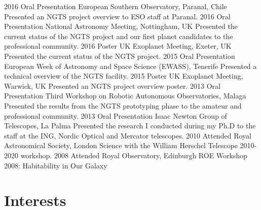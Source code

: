 \documentclass[print]{friggeri-cv} %
\begin{document}
\begin{entrylist}
\entry
{\small 2016}
{\small Oral Presentation}
{\small European Southern Observatory, Paranal, Chile}
{\small Presented an NGTS project overview to ESO staff at Paranal.}
\entry
{\small 2016}
{\small Oral Presentation}
{\small National Astronomy Meeting, Nottingham, UK}
{\small Presented the current status of the NGTS project and our first planet candidates to the professional community.}
\entry
{\small 2016}
{\small Poster}
{\small UK Exoplanet Meeting, Exeter, UK}
{\small Presented the current status of the NGTS project.}
\entry
{\small 2015}
{\small Oral Presentation}
{\small European Week of Astronomy and Space Science (EWASS), Tenerife}
{\small Presented a technical overview of the NGTS facility.}
\entry
{\small 2015}
{\small Poster}
{\small UK Exoplanet Meeting, Warwick, UK}
{\small Presented an NGTS project overview poster.}
\entry
{\small 2013}
{\small Oral Presentation}
{\small Third Workshop on Robotic Autonomous Observatories, Malaga}
{\small Presented the results from the NGTS prototyping phase to the amateur and professional community.}
\entry
{\small 2013}
{\small Oral Presentation}
{\small Isaac Newton Group of Telescopes, La Palma}
{\small Presented the research I conducted during my Ph.D to the staff at the ING, Nordic Optical and Mercator telescopes.}
\entry
{\small 2010}
{\small Attended}
{\small Royal Astronomical Society, London}
{\small Science with the William Herschel Telescope 2010-2020 workshop.}
\entry
{\small 2008}
{\small Attended}
{\small Royal Observatory, Edinburgh}
{\small ROE Workshop 2008: Habitability in Our Galaxy}
\end{entrylist}

\section{Interests}
\end{document}
